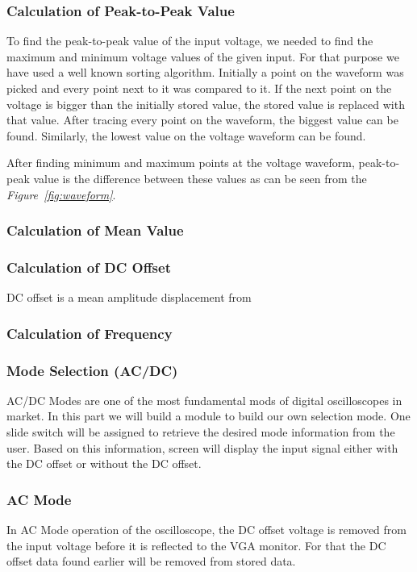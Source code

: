 \documentclass[paper]{IEEEtran}
\begin{document}
	
	
	\subsubsection{Calculation of Peak-to-Peak Value }	
	\- \indent
	To find the peak-to-peak value of the input voltage, we needed to find the maximum and minimum voltage values of the given input. For that purpose we have used a well known sorting algorithm. Initially a point on the waveform was picked and every point next to it was compared to it. If the next point on the voltage is bigger than the initially stored value, the stored value is replaced with that value. After tracing every point on the waveform, the biggest value can be found. Similarly, the lowest value on the voltage waveform can be found. 
	
	After finding minimum and maximum points at the voltage waveform, peak-to-peak value is the difference between these values as can be seen from the \textit{Figure~\ref{fig:waveform}}.  	
	
	
	\subsubsection{Calculation of Mean Value}
	
	
	\subsubsection{Calculation of DC Offset}
	
	DC offset is a mean amplitude displacement from
	
	
	\subsubsection{Calculation of Frequency}
	
	
	
	\subsubsection{Mode Selection (AC/DC)} \- \indent
	AC/DC Modes are one of the most fundamental mods of digital oscilloscopes in market. In this part we will build a module to build our own selection mode. One slide switch will be assigned to retrieve the desired mode information from the user. Based on this information, screen will display the input signal either with the DC offset or without the DC offset.
	
	\subsubsection*{AC Mode} \- \indent
	In AC Mode operation of the oscilloscope, the DC offset voltage is removed from the input voltage before it is reflected to the VGA monitor. For that the DC offset data found earlier will be removed from stored data.
	
\end{document}
